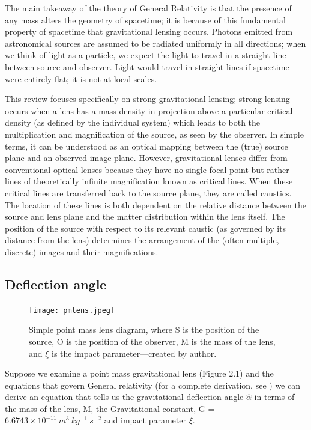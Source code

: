 \documentclass[12pt]{report}
\begin{document}
The main takeaway of the theory of General Relativity is that the presence of any mass alters the geometry of spacetime; it is because of this fundamental property of spacetime that gravitational lensing occurs. Photons emitted from astronomical sources are assumed to be radiated uniformly in all directions; when we think of light as a particle, we expect the light to travel in a straight line between source and observer. Light would travel in straight lines if spacetime were entirely flat; it is not at local scales.

This review focuses specifically on strong gravitational lensing; strong lensing occurs when a lens has a mass density in projection above a particular critical density (as defined by the individual system) which leads to both the multiplication and magnification of the source, as seen by the observer. In simple terms, it can be understood as an optical mapping between the (true) source plane and an observed image plane. However, gravitational lenses differ from conventional optical lenses because they have no single focal point but rather lines of theoretically infinite magnification known as critical lines. When these critical lines are transferred back to the source plane, they are called caustics. The location of these lines is both dependent on the relative distance between the source and lens plane and the matter distribution within
the lens itself. The position of the source with respect to its relevant caustic (as governed by its distance from the lens) determines the arrangement of the (often multiple, discrete) images and their magnifications.

\subsection{Deflection angle}

\begin{figure} [h]
    \centering
    \texttt{[image: pmlens.jpeg]}
    \caption{Simple point mass lens diagram, where S is the position of the source, O is the position of the observer, M is the mass of the lens, and $\xi$ is the impact parameter—created by author.}
    \label{fig:figure1}
\end{figure}


Suppose we examine a point mass gravitational lens (Figure 2.1) and the equations that govern General relativity (for a complete derivation, see \textcite{Carroll2004}) we can derive an equation that tells us the gravitational deflection angle $\hat{\alpha}$ in terms of the mass of the lens, M, the Gravitational constant, G = $6.6743 \times 10^{-11} \ m^{3} \ kg^{-1} \ s^{-2}$ and impact parameter $\xi$.  
\end{document}
